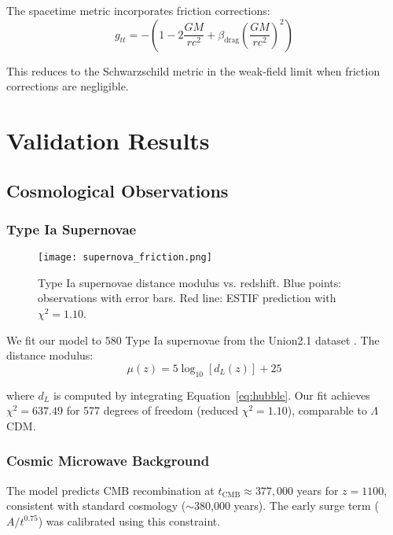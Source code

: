 \documentclass[12pt,a4paper]{article}
\begin{document}
The spacetime metric incorporates friction corrections:
\begin{equation}
g_{tt} = -\left(1 - 2\frac{GM}{rc^2} + \beta_{\text{drag}}\left(\frac{GM}{rc^2}\right)^2\right)
\label{eq:metric}
\end{equation}

This reduces to the Schwarzschild metric in the weak-field limit when friction corrections are negligible.

\section{Validation Results}

\subsection{Cosmological Observations}

\subsubsection{Type Ia Supernovae}

\begin{figure}[h]
\centering
\texttt{[image: supernova\_friction.png]}
\caption{Type Ia supernovae distance modulus vs. redshift. Blue points: observations with error bars. Red line: ESTIF prediction with $\chi^2 = 1.10$.}
\label{fig:supernovae}
\end{figure}

We fit our model to 580 Type Ia supernovae from the Union2.1 dataset \cite{Suzuki2012}. The distance modulus:
\begin{equation}
\mu(z) = 5\log_{10}[d_L(z)] + 25
\end{equation}

where $d_L$ is computed by integrating Equation~\ref{eq:hubble}. Our fit achieves $\chi^2 = 637.49$ for 577 degrees of freedom (reduced $\chi^2 = 1.10$), comparable to $\Lambda$CDM.

\subsubsection{Cosmic Microwave Background}

The model predicts CMB recombination at $t_{\text{CMB}} \approx 377,000$ years for $z = 1100$, consistent with standard cosmology ($\sim$380,000 years). The early surge term ($A/t^{0.75}$) was calibrated using this constraint.
\end{document}
